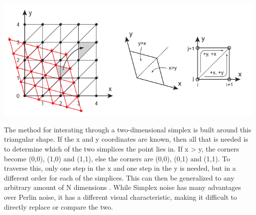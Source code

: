 \documentclass[10pt]{report}
\begin{document}
			\begin{minipage}{\textwidth}
				\centering
				\includegraphics[scale=.5]{skewed grid}
				\label{fig:fig9}
			\end{minipage}
			
			The method for interating through a two-dimensional simplex is built around this triangular shape. If the x and y coordinates are known, then all that is needed is to determine which of the two simplices the point lies in. If x > y, the corners become (0,0), (1,0) and (1,1), else the corners are (0,0), (0,1) and (1,1). To traverse this, only one step in the x and one step in the y is needed, but in a different order for each of the simplices. This can then be generalized to any arbitrary amount of N dimensions \cite{simplex-demyst}. While Simplex noise has many advantages over Perlin noise, it has a different visual characteristic, making it difficult to directly replace or compare the two. 
			
\end{document}
